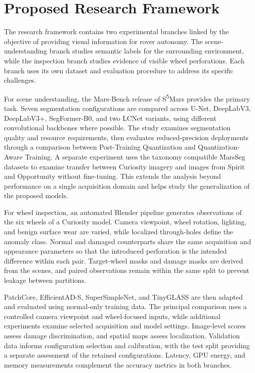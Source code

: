 \section{Proposed Research Framework}

The research framework contains two experimental branches linked by the objective of providing visual information for rover autonomy. The scene-understanding branch studies semantic labels for the surrounding environment, while the inspection branch studies evidence of visible wheel perforations. Each branch uses its own dataset and evaluation procedure to address its specific challenges.

For scene understanding, the Mars-Bench release of S\textsuperscript{5}Mars provides the primary task. Seven segmentation configurations are compared across U-Net, DeepLabV3, DeepLabV3+, SegFormer-B0, and two LCNet variants, using different convolutional backbones where possible. The study examines segmentation quality and resource requirements, then evaluates reduced-precision deployments through a comparison between Post-Training Quantization and Quantization-Aware Training. A separate experiment uses the taxonomy compatible MarsSeg datasets to examine transfer between Curiosity imagery and images from Spirit and Opportunity without fine-tuning. This extends the analysis beyond performance on a single acquisition domain and helps study the generalization of the proposed models.

For wheel inspection, an automated Blender pipeline generates observations of the six wheels of a Curiosity model. Camera viewpoint, wheel rotation, lighting, and benign surface wear are varied, while localized through-holes define the anomaly class. Normal and damaged counterparts share the same acquisition and appearance parameters so that the introduced perforation is the intended difference within each pair. Target-wheel masks and damage masks are derived from the scenes, and paired observations remain within the same split to prevent leakage between partitions.

PatchCore, EfficientAD-S, SuperSimpleNet, and TinyGLASS are then adapted and evaluated using normal-only training data. The principal comparison uses a controlled camera viewpoint and wheel-focused inputs, while additional experiments examine selected acquisition and model settings. Image-level scores assess damage discrimination, and spatial maps assess localization. Validation data informs configuration selection and calibration, with the test split providing a separate assessment of the retained configurations. Latency, GPU energy, and memory measurements complement the accuracy metrics in both branches.

